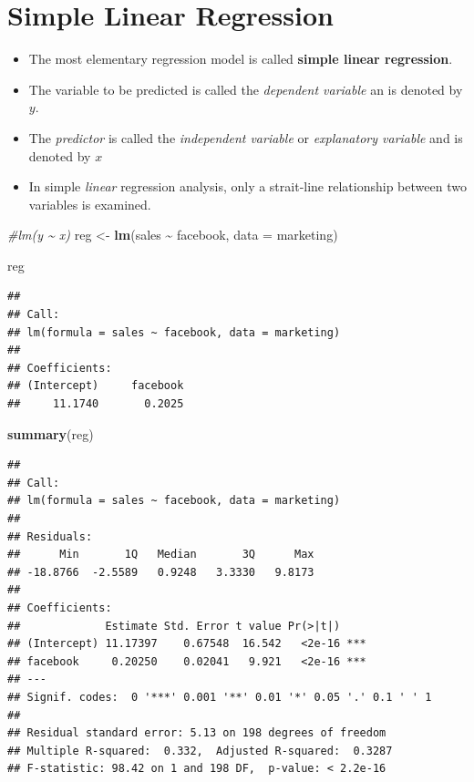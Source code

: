 \documentclass[
]{book}
\newenvironment{Shaded}{\begin{snugshade}}{\end{snugshade}}
\newcommand{\AttributeTok}[1]{\textcolor[rgb]{0.13,0.29,0.53}{#1}}
\newcommand{\CommentTok}[1]{\textcolor[rgb]{0.56,0.35,0.01}{\textit{#1}}}
\newcommand{\FunctionTok}[1]{\textcolor[rgb]{0.13,0.29,0.53}{\textbf{#1}}}
\newcommand{\NormalTok}[1]{#1}
\newcommand{\OtherTok}[1]{\textcolor[rgb]{0.56,0.35,0.01}{#1}}
\newcommand{\SpecialCharTok}[1]{\textcolor[rgb]{0.81,0.36,0.00}{\textbf{#1}}}
\begin{document}
\hypertarget{simple-linear-regression}{%
\section{Simple Linear Regression}\label{simple-linear-regression}}

\begin{itemize}
\item
  The most elementary regression model is called \textbf{simple linear regression}.
\item
  The variable to be predicted is called the \emph{dependent variable} an is denoted by \(y\).
\item
  The \emph{predictor} is called the \emph{independent variable} or \emph{explanatory variable} and is denoted by \(x\)
\item
  In simple \emph{linear} regression analysis, only a strait-line relationship between two variables is examined.
\end{itemize}

\begin{Shaded}
\begin{Highlighting}[]
\CommentTok{\#lm(y \textasciitilde{} x)}
\NormalTok{reg }\OtherTok{\textless{}{-}} \FunctionTok{lm}\NormalTok{(sales }\SpecialCharTok{\textasciitilde{}}\NormalTok{ facebook,  }\AttributeTok{data =}\NormalTok{ marketing)}

\NormalTok{reg}
\end{Highlighting}
\end{Shaded}

\begin{verbatim}
## 
## Call:
## lm(formula = sales ~ facebook, data = marketing)
## 
## Coefficients:
## (Intercept)     facebook  
##     11.1740       0.2025
\end{verbatim}

\begin{Shaded}
\begin{Highlighting}[]
\FunctionTok{summary}\NormalTok{(reg)}
\end{Highlighting}
\end{Shaded}

\begin{verbatim}
## 
## Call:
## lm(formula = sales ~ facebook, data = marketing)
## 
## Residuals:
##      Min       1Q   Median       3Q      Max 
## -18.8766  -2.5589   0.9248   3.3330   9.8173 
## 
## Coefficients:
##             Estimate Std. Error t value Pr(>|t|)    
## (Intercept) 11.17397    0.67548  16.542   <2e-16 ***
## facebook     0.20250    0.02041   9.921   <2e-16 ***
## ---
## Signif. codes:  0 '***' 0.001 '**' 0.01 '*' 0.05 '.' 0.1 ' ' 1
## 
## Residual standard error: 5.13 on 198 degrees of freedom
## Multiple R-squared:  0.332,  Adjusted R-squared:  0.3287 
## F-statistic: 98.42 on 1 and 198 DF,  p-value: < 2.2e-16
\end{verbatim}
\end{document}
